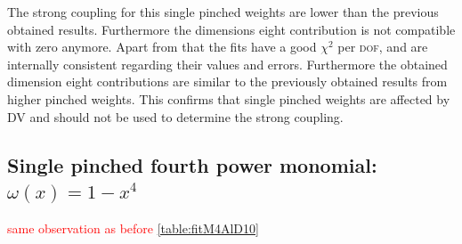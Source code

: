 \documentclass[../../index.tex]{subfiles}
\begin{document}
The strong coupling for this single pinched weights are lower than the previous
obtained results. Furthermore the dimensions eight contribution is not
compatible with zero anymore. Apart from that the fits have a good $\chi^2$ per
\textsc{dof}, and are internally consistent regarding their values and errors.
Furthermore the obtained dimension eight contributions are similar to the
previously obtained results from higher pinched weights. This confirms that
single pinched weights are affected by \textsc{DV} and should not be used to
determine the strong coupling.

\subsection{Single pinched fourth power monomial: $\omega(x) = 1-x^4$}
\textcolor{red}{same observation as before} \cref{table:fitM4AlD10}
\end{document}
